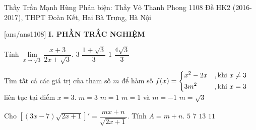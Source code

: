 \begin{name}
{Thầy Trần Mạnh Hùng \newline Phản biện: Thầy Võ Thanh Phong}
{1108 Đề HK2 (2016-2017), THPT Đoàn Kết, Hai Bà Trưng, Hà Nội}%
	\end{name}
	\setcounter{ex}{0}\setcounter{bt}{0}
	[ans/ans1108]
\noindent\textbf{I. PHẦN TRẮC NGHIỆM}
\begin{ex}%
	Tính $\lim\limits_{x\to \sqrt{3}}\dfrac{x+3}{2x+\sqrt{3}}$.
	\choice
	{$3$}
	{\True $\dfrac{1+\sqrt{3}}{3}$}
	{$1$}
	{$\dfrac{4\sqrt{3}}{3}$}
\end{ex}
\begin{ex}%
	Tìm tất cả các giá trị của tham số $m$ để hàm số $f(x)=\left\{\begin{aligned}&x^2-2x &,\text{khi }x\ne 3\\&3m^2 &,\text{khi }x=3\end{aligned}\right.$ liên tục tại điểm $x=3$.
	\choice
	{$m=3$}
	{$m=1$}
	{\True $m=1$ và $m=-1$}
	{$m=\sqrt{3}$}
\end{ex}
\begin{ex}%
	Cho $\left[(3x-7)\sqrt{2x+1}\right]'=\dfrac{mx+n}{\sqrt{2x+1}}$. Tính $A=m+n$.
	\choice
	{\True $5$}
	{$7$}
	{$13$}
	{$11$}
\end{ex}
